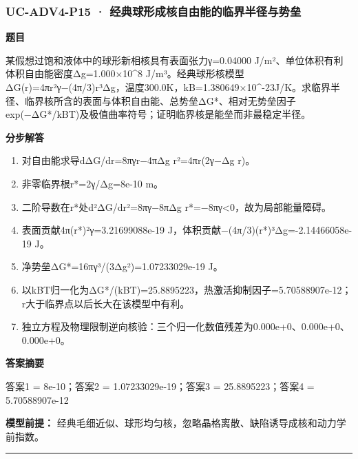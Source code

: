 \documentclass[UTF8,11pt,a4paper]{ctexart}
\begin{document}
\subsubsection*{UC-ADV4-P15 · 经典球形成核自由能的临界半径与势垒}
\noindent\textbf{题目}\par
某假想过饱和液体中的球形新相核具有表面张力γ=0.04000 J/m²、单位体积有利体积自由能密度Δg=1.000×10\textasciicircum{}8 J/m³。经典球形核模型ΔG(r)=4πr²γ−(4π/3)r³Δg，温度300.0K，kB=1.380649×10\textasciicircum{}-23J/K。求临界半径、临界核所含的表面与体积自由能、总势垒ΔG*、相对无势垒因子exp(−ΔG*/kBT)及极值曲率符号；证明临界核是能垒而非最稳定半径。\par
\medskip\noindent\textbf{分步解答}
\begin{enumerate}
\item 对自由能求导dΔG/dr=8πγr−4πΔg r²=4πr(2γ−Δg r)。
\item 非零临界根r*=2γ/Δg=8e-10 m。
\item 二阶导数在r*处d²ΔG/dr²=8πγ−8πΔg r*=−8πγ<0，故为局部能量障碍。
\item 表面贡献4π(r*)²γ=3.21699088e-19 J，体积贡献−(4π/3)(r*)³Δg=-2.14466058e-19 J。
\item 净势垒ΔG*=16πγ³/(3Δg²)=1.07233029e-19 J。
\item 以kBT归一化为ΔG*/(kBT)=25.8895223，热激活抑制因子=5.70588907e-12；r大于临界点以后长大在该模型中有利。
\item 独立方程及物理限制逆向核验：三个归一化数值残差为0.000e+0、0.000e+0、0.000e+0。
\end{enumerate}
\noindent\textbf{答案摘要}\par
答案1 = 8e-10；答案2 = 1.07233029e-19；答案3 = 25.8895223；答案4 = 5.70588907e-12\par
\noindent\textbf{模型前提：}
经典毛细近似、球形均匀核，忽略晶格离散、缺陷诱导成核和动力学前指数。\par
\medskip\hrule\medskip
{}
\end{document}
